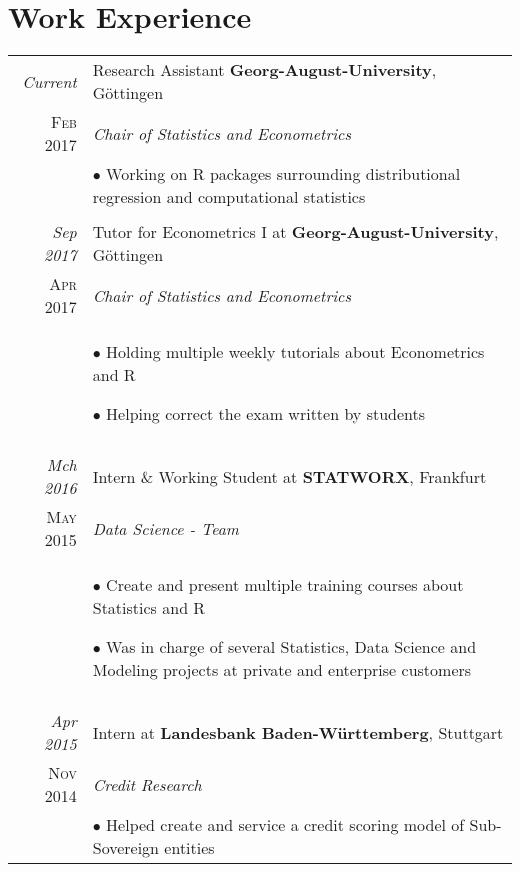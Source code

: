 \documentclass[a4paper,10pt]{article} %
\begin{document}
\section{Work Experience}

\begin{longtable}{r|p{10cm}}


  \emph{Current} & Research Assistant \textbf{Georg-August-University}, Göttingen\\
  \textsc{Feb 2017} & \emph{Chair of Statistics and Econometrics}\\
  & \footnotesize{
  $\bullet$ Working on R packages surrounding distributional regression and computational statistics}\\
  \multicolumn{2}{c}{} \\


  \emph{Sep 2017} & Tutor for Econometrics I at \textbf{Georg-August-University}, Göttingen\\
  \textsc{Apr 2017} & \emph{Chair of Statistics and Econometrics}\\
  & \footnotesize{$\bullet$ Holding multiple weekly tutorials about Econometrics and R

  $\bullet$ Helping correct the exam written by students}\\
  \multicolumn{2}{c}{} \\


\emph{Mch 2016} & Intern \& Working Student at \textbf{STATWORX}, Frankfurt\\
\textsc{May 2015} & \emph{Data Science - Team} \\
& \footnotesize{$\bullet$ Create and present multiple training courses about Statistics and R

$\bullet$ Was in charge of several Statistics, Data Science and Modeling projects at private and enterprise customers}\\
\multicolumn{2}{c}{} \\


\emph{Apr 2015} & Intern at \textbf{Landesbank Baden-Württemberg}, Stuttgart\\
\textsc{Nov 2014} & \emph{Credit Research} \\
& \footnotesize{$\bullet$ Helped create and service a credit scoring model of Sub-Sovereign entities

}
\end{longtable}
\end{document}

